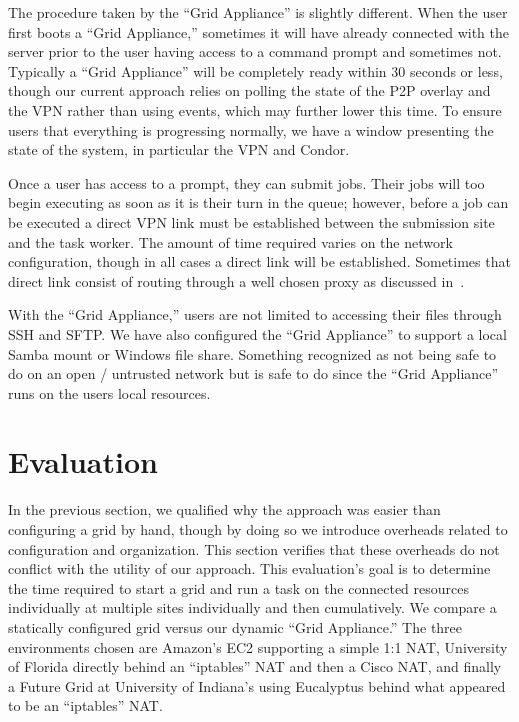 \documentclass[conference]{IEEEtran}
\begin{document}
The procedure taken by the ``Grid Appliance'' is slightly different.  When the
user first boots a ``Grid Appliance,'' sometimes it will have already connected
with the server prior to the user having access to a command prompt and
sometimes not.  Typically a ``Grid Appliance'' will be completely ready within
30 seconds or less, though our current approach relies on polling the state of
the P2P overlay and the VPN rather than using events, which may further lower
this time.  To ensure users that everything is progressing normally, we have a
window presenting the state of the system, in particular the VPN and Condor.

Once a user has access to a prompt, they can submit jobs.  Their jobs will too
begin executing as soon as it is their turn in the queue; however, before a job
can be executed a direct VPN link must be established between the submission
site and the task worker.  The amount of time required varies on the network
configuration, though in all cases a direct link will be established.
Sometimes that direct link consist of routing through a well chosen proxy as
discussed in~\cite{groupvpn}.

With the ``Grid Appliance,'' users are not limited to accessing their files
through SSH and SFTP.  We have also configured the ``Grid Appliance'' to
support a local Samba mount or Windows file share.  Something recognized as not
being safe to do on an open / untrusted network but is safe to do since the
``Grid Appliance'' runs on the users local resources.

\section{Evaluation}
\label{evaluation}

In the previous section, we qualified why the approach was easier than
configuring a grid by hand, though by doing so we introduce overheads related
to configuration and organization.  This section verifies that these overheads
do not conflict with the utility of our approach.  This evaluation's goal is to
determine the time required to start a grid and run a task on the connected
resources individually at multiple sites individually and then cumulatively.
We compare a statically configured grid versus our dynamic ``Grid Appliance.''
The three environments chosen are Amazon's EC2 supporting a simple 1:1 NAT,
University of Florida directly behind an ``iptables'' NAT and then a Cisco NAT,
and finally a Future Grid at University of Indiana's using Eucalyptus behind
what appeared to be an ``iptables'' NAT.
\end{document}
